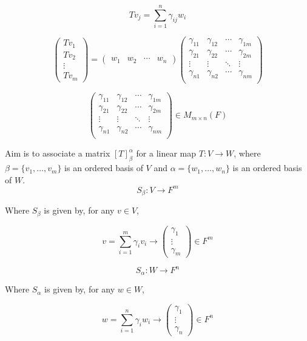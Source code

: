 \documentclass[11pt,a4paper]{colorart}
\def\l{\left}
\def\r{\right}
\def\a{\alpha}
\def\b{\beta}
\def\g{\gamma}
\begin{document}
\[ Tv_j = \sum_{i=1}^n \g_{ij}w_i \]

\[ \begin{pmatrix} Tv_1 \\ Tv_2 \\ \vdots \\ Tv_m \end{pmatrix} = 
   \begin{pmatrix} w_1  & w_2  & \cdots & w_n  \end{pmatrix} 
   \begin{pmatrix}
	  \g_{11} & \g_{12} & \cdots & \g_{1m} \\
	  \g_{21} & \g_{22} & \cdots & \g_{2m} \\
	  \vdots  & \vdots  & \ddots & \vdots \\
	  \g_{n1} & \g_{n2} & \cdots & \g_{nm} \\
   \end{pmatrix} \]

\[ \begin{pmatrix}
	  \g_{11} & \g_{12} & \cdots & \g_{1m} \\
	  \g_{21} & \g_{22} & \cdots & \g_{2m} \\
	  \vdots  & \vdots  & \ddots & \vdots \\
	  \g_{n1} & \g_{n2} & \cdots & \g_{nm} \\
\end{pmatrix} \in M_{m\times n}\l(F\r)\]

Aim is to associate a matrix $\l[T\r]^{\a}_{\b}$ for a linear map $T:V\rightarrow W$, where $\b=\{v_1,\dots,v_m\}$ is an ordered basis of $V$ and $\a=\{w_1,\dots,w_n\}$ is an ordered basis of $W$.\\

\[ S_\b:V\rightarrow F^m \]

Where $S_\b$ is given by, for any $v\in V$,

\[ v = \sum_{i=1}^m \g_iv_i \rightarrow 
   \begin{pmatrix} \g_1\\ \vdots \\ \g_m \end{pmatrix} \in F^m \]

\[ S_\a:W\rightarrow F^n \]

Where $S_\a$ is given by, for any $w\in W$,

\[ w = \sum_{i=1}^n \g_iw_i \rightarrow 
   \begin{pmatrix} \g_1\\ \vdots \\ \g_n \end{pmatrix} \in F^n \]
\end{document}

